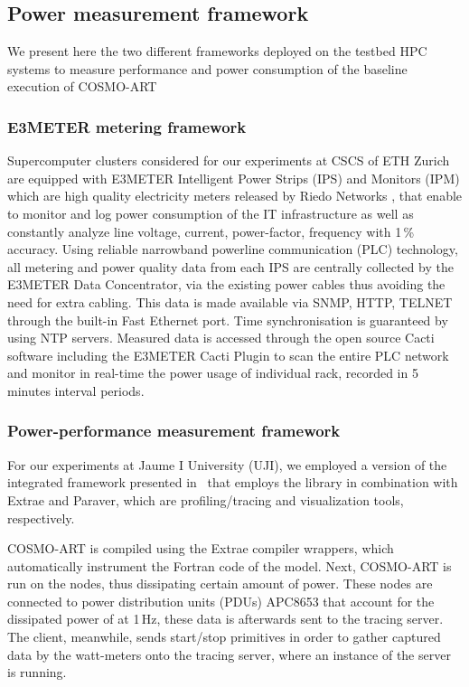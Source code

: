\subsection{Power measurement framework}
\label{subsec:3.3}

We present here the two different  frameworks deployed on the testbed HPC systems to
measure  performance and  power  consumption of the baseline execution of COSMO-ART

\subsubsection{E3METER metering framework}

Supercomputer  clusters considered  for our  experiments at CSCS of ETH Zurich are equipped with
E3METER Intelligent  Power Strips (IPS)  and Monitors (IPM)  which are
high   quality   electricity  meters   released   by  Riedo   Networks
\citep{Riedonetworks},   that  enable   to  monitor   and   log  power
consumption  of the IT  infrastructure as  well as  constantly analyze
line  voltage,  current, power-factor,  frequency  with 1\,\%  accuracy.
Using  reliable narrowband  powerline communication  (PLC) technology,
all  metering and  power  quality  data from  each  IPS are  centrally
collected  by the E3METER  Data Concentrator,  via the  existing power
cables thus  avoiding the need for  extra cabling.  This  data is made
available via  SNMP, HTTP, TELNET  through the built-in  Fast Ethernet
port.   Time  synchronisation  is  guaranteed by  using  NTP  servers.
Measured  data is  accessed  through the  open  source Cacti  software
including the E3METER Cacti Plugin  to scan the entire PLC network and
monitor in real-time the power usage of individual rack, recorded in 5
minutes interval periods.

\subsubsection{Power-performance measurement framework}

For our experiments at Jaume I University (UJI), we employed a version
of the integrated framework presented in~\cite{energy13} that employs the \pmlib library in
combination with Extrae and Paraver, which  are profiling/tracing and
visualization tools, respectively.

\textsc{COSMO-ART}  is compiled  using the  Extrae  compiler wrappers,
which automatically  instrument the Fortran code of  the model.  Next,
\textsc{COSMO-ART}  is  run on  the  nodes,  thus dissipating  certain
amount  of power.   These  nodes are connected to power distribution units (PDUs)
APC8653 that account for the dissipated power of at 1\,Hz, these data is afterwards sent
to the  tracing server. The client,  meanwhile, sends start/stop  primitives  in  order  to  gather  captured  data  by  the watt-meters onto the  tracing server, where an instance  of the \pmlib server is running.

